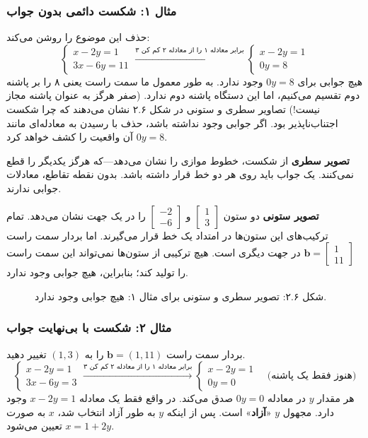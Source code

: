 \documentclass[12pt, a4paper]{book}
\theoremstyle{translator}
\begin{document}
	\subsubsection*{مثال ۱: شکست دائمی بدون جواب}
	حذف این موضوع را روشن می‌کند:
	\[
	\begin{cases}
		x - 2y = 1 \\
		3x - 6y = 11
	\end{cases}
	\xrightarrow{\text{۳ برابر معادله ۱ را از معادله ۲ کم کن}}
	\begin{cases}
		x - 2y = 1 \\
		0y = 8
	\end{cases}
	\]
	هیچ جوابی برای $0y = 8$ وجود ندارد. به طور معمول ما سمت راست یعنی ۸ را بر پاشنه دوم تقسیم می‌کنیم، اما این دستگاه پاشنه دوم ندارد. (صفر هرگز به عنوان پاشنه مجاز نیست!) تصاویر سطری و ستونی در شکل ۲.۶ نشان می‌دهند که چرا شکست اجتناب‌ناپذیر بود. اگر جوابی وجود نداشته باشد، حذف با رسیدن به معادله‌ای مانند $0y=8$ آن واقعیت را کشف خواهد کرد.
	
	\textbf{تصویر سطری} از شکست، خطوط موازی را نشان می‌دهد—که هرگز یکدیگر را قطع نمی‌کنند. یک جواب باید روی هر دو خط قرار داشته باشد. بدون نقطه تقاطع، معادلات جوابی ندارند.
	
	\textbf{تصویر ستونی} دو ستون $\begin{bmatrix} 1 \\ 3 \end{bmatrix}$ و $\begin{bmatrix} -2 \\ -6 \end{bmatrix}$ را در یک جهت نشان می‌دهد. تمام ترکیب‌های این ستون‌ها در امتداد یک خط قرار می‌گیرند. اما بردار سمت راست $\mathbf{b} = \begin{bmatrix} 1 \\ 11 \end{bmatrix}$ در جهت دیگری است. هیچ ترکیبی از ستون‌ها نمی‌تواند این سمت راست را تولید کند؛ بنابراین، هیچ جوابی وجود ندارد.
	
	\begin{figure}[h!]
		\centering
		\caption{شکل ۲.۶: تصویر سطری و ستونی برای مثال ۱: هیچ جوابی وجود ندارد.}
	\end{figure}
	
	\subsubsection*{مثال ۲: شکست با بی‌نهایت جواب}
	بردار سمت راست $\mathbf{b} = (1, 11)$ را به $(1, 3)$ تغییر دهید.
	\[
	\begin{cases}
		x - 2y = 1 \\
		3x - 6y = 3
	\end{cases}
	\xrightarrow{\text{۳ برابر معادله ۱ را از معادله ۲ کم کن}}
	\begin{cases}
		x - 2y = 1 \\
		0y = 0
	\end{cases}
	\quad \text{(هنوز فقط یک پاشنه)}
	\]
	هر مقدار $y$ در معادله $0y = 0$ صدق می‌کند. در واقع فقط یک معادله $x - 2y = 1$ وجود دارد. مجهول $y$ «\textbf{آزاد}» است. پس از اینکه $y$ به طور آزاد انتخاب شد، $x$ به صورت $x = 1+2y$ تعیین می‌شود.
	
\end{document}

